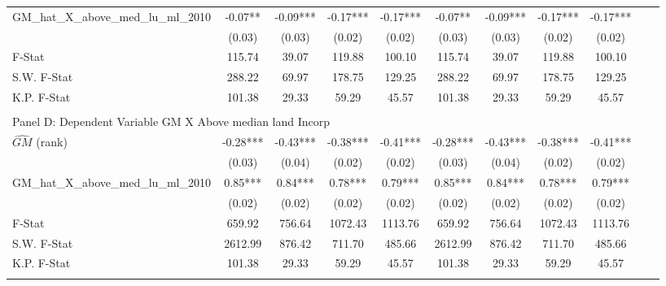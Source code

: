 \begin{table}[htbp]
\begin{threeparttable}
\begin{tabular}{l*{10}{c}}
\addlinespace
GM\_hat\_X\_above\_med\_lu\_ml\_2010&      -0.07** &      -0.09***&      -0.17***&      -0.17***&      -0.07** &      -0.09***&      -0.17***&      -0.17***\\
                &     (0.03)   &     (0.03)   &     (0.02)   &     (0.02)   &     (0.03)   &     (0.03)   &     (0.02)   &     (0.02)   \\
\midrule
F-Stat          &     115.74   &      39.07   &     119.88   &     100.10   &     115.74   &      39.07   &     119.88   &     100.10   \\
S.W. F-Stat     &     288.22   &      69.97   &     178.75   &     129.25   &     288.22   &      69.97   &     178.75   &     129.25   \\
K.P. F-Stat     &     101.38   &      29.33   &      59.29   &      45.57   &     101.38   &      29.33   &      59.29   &      45.57   \\
\cmidrule[\heavyrulewidth](lr){1-9} \\ \cmidrule[\heavyrulewidth](lr){1-9}
\multicolumn{8}{l}{Panel D: Dependent Variable GM X Above median land Incorp}\\
\cmidrule(lr){1-9}
$\hat{GM}$ (rank)&      -0.28***&      -0.43***&      -0.38***&      -0.41***&      -0.28***&      -0.43***&      -0.38***&      -0.41***\\
                &     (0.03)   &     (0.04)   &     (0.02)   &     (0.02)   &     (0.03)   &     (0.04)   &     (0.02)   &     (0.02)   \\
\addlinespace
GM\_hat\_X\_above\_med\_lu\_ml\_2010&       0.85***&       0.84***&       0.78***&       0.79***&       0.85***&       0.84***&       0.78***&       0.79***\\
                &     (0.02)   &     (0.02)   &     (0.02)   &     (0.02)   &     (0.02)   &     (0.02)   &     (0.02)   &     (0.02)   \\
\midrule
F-Stat          &     659.92   &     756.64   &    1072.43   &    1113.76   &     659.92   &     756.64   &    1072.43   &    1113.76   \\
S.W. F-Stat     &    2612.99   &     876.42   &     711.70   &     485.66   &    2612.99   &     876.42   &     711.70   &     485.66   \\
K.P. F-Stat     &     101.38   &      29.33   &      59.29   &      45.57   &     101.38   &      29.33   &      59.29   &      45.57   \\
\cmidrule[\heavyrulewidth](lr){1-9} \\ \cmidrule[\heavyrulewidth](lr){1-9}

\end{tabular}
\end{threeparttable}
\end{table}
